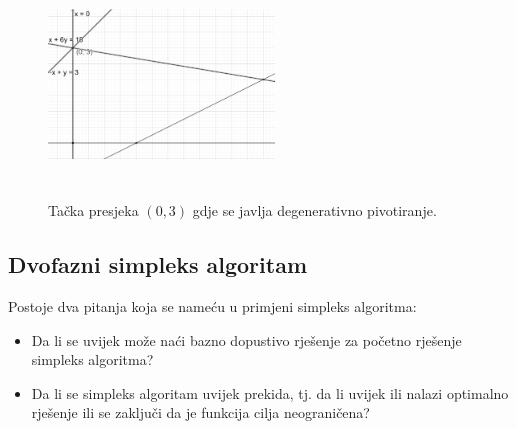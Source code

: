 \documentclass[a4paper, utf8, 11pt, colorlinks]{article}
\begin{document}
\begin{figure}[!ht]
	\centering
	\includegraphics[width=170pt,height=170pt]{deg-sol.eps}
	\caption{Tačka presjeka $(0,3)$ gdje se javlja degenerativno pivotiranje.}
	\label{fig:deg-sol}
\end{figure}

 \subsection{Dvofazni simpleks algoritam}
 Postoje dva pitanja koja se nameću u primjeni simpleks algoritma:
 \begin{itemize}
     \item Da li se uvijek može naći bazno dopustivo rješenje za početno rješenje 
     simpleks algoritma?
     \item Da li se simpleks algoritam uvijek prekida, tj. da li uvijek ili nalazi optimalno rješenje ili se zaključi da je funkcija cilja neograničena?
 \end{itemize}
 
\end{document}
